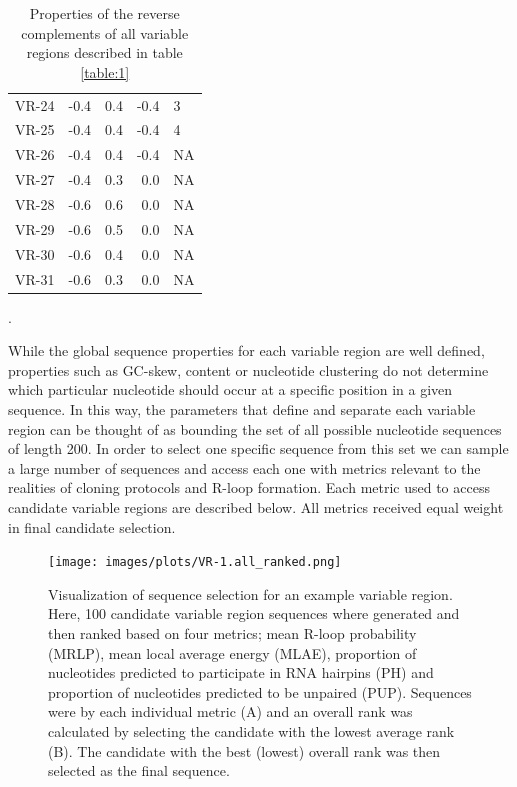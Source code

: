 \documentclass[11pt]{article}
\begin{document}
\begin{table}
\begin{tabular}{lrrrl}
	VR-24 &     -0.4 &         0.4 &     -0.4 &              3 \\
	VR-25 &     -0.4 &         0.4 &     -0.4 &              4 \\
	VR-26 &     -0.4 &         0.4 &     -0.4 &             NA \\
	VR-27 &     -0.4 &         0.3 &      0.0 &             NA \\
	VR-28 &     -0.6 &         0.6 &      0.0 &             NA \\
	VR-29 &     -0.6 &         0.5 &      0.0 &             NA \\
	VR-30 &     -0.6 &         0.4 &      0.0 &             NA \\
	VR-31 &     -0.6 &         0.3 &      0.0 &             NA \\
	\bottomrule
\end{tabular}
\caption{Properties of the reverse complements of all variable regions described in table \ref{table:1}}.
\end{table}

While the global sequence properties for each variable region are well defined, properties such as GC-skew, content or nucleotide clustering do not determine which particular nucleotide should occur at a specific position in a given sequence. In this way, the parameters that define and separate each variable region can be thought of as bounding the set of all possible nucleotide sequences of length 200. In order to select one specific sequence from this set we can sample a large number of sequences and access each one with metrics relevant to the realities of cloning protocols and R-loop formation. Each metric used to access candidate variable regions are described below. All metrics received equal weight in final candidate selection. 

\begin{figure}[H]
	\texttt{[image: images/plots/VR-1.all\_ranked.png]}
	\centering
	\caption{Visualization of sequence selection for an example variable region. Here, 100 candidate variable region sequences where generated and then ranked based on four metrics; mean R-loop probability (MRLP), mean local average energy (MLAE), proportion of nucleotides predicted to participate in RNA hairpins (PH) and proportion of nucleotides predicted to be unpaired (PUP). Sequences were by each individual metric (A) and an overall rank was calculated by selecting the candidate with the lowest average rank (B). The candidate with the best (lowest) overall rank was then selected as the final sequence.}
	\label{ranking}
\end{figure}
\end{document}
